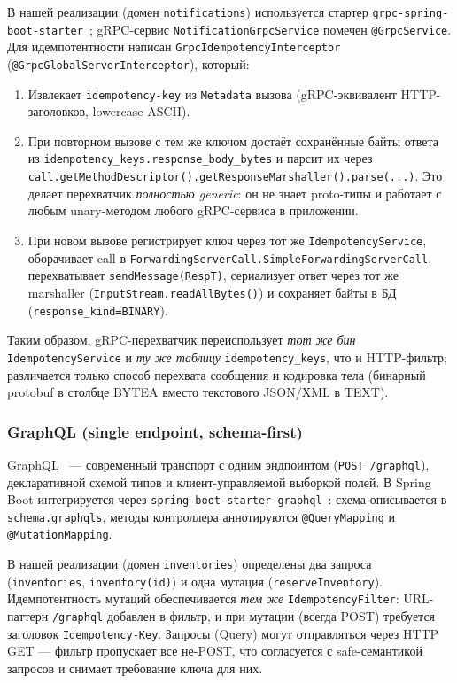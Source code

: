 В нашей реализации (домен \texttt{notifications}) используется стартер \texttt{grpc-spring-boot-starter}~\cite{grpc-spring-boot}; gRPC-сервис \texttt{NotificationGrpcService} помечен \texttt{@GrpcService}. Для идемпотентности написан \texttt{GrpcIdempotencyInterceptor} (\texttt{@GrpcGlobalServerInterceptor}), который:
\begin{enumerate}
    \item Извлекает \texttt{idempotency-key} из \texttt{Metadata} вызова (gRPC-эквивалент HTTP-заголовков, lowercase ASCII).
    \item При повторном вызове с тем же ключом достаёт сохранённые байты ответа из \texttt{idempotency\_keys.response\_body\_bytes} и парсит их через \texttt{call.getMethodDescriptor().getResponseMarshaller().parse(...)}. Это делает перехватчик \emph{полностью generic}: он не знает proto-типы и работает с любым unary-методом любого gRPC-сервиса в приложении.
    \item При новом вызове регистрирует ключ через тот же \texttt{IdempotencyService}, оборачивает call в \texttt{ForwardingServerCall.SimpleForwardingServerCall}, перехватывает \texttt{sendMessage(RespT)}, сериализует ответ через тот же marshaller (\texttt{InputStream.readAllBytes()}) и сохраняет байты в БД (\texttt{response\_kind=BINARY}).
\end{enumerate}

Таким образом, gRPC-перехватчик переиспользует \emph{тот же бин} \texttt{IdempotencyService} и \emph{ту же таблицу} \texttt{idempotency\_keys}, что и HTTP-фильтр; различается только способ перехвата сообщения и кодировка тела (бинарный protobuf в столбце BYTEA вместо текстового JSON/XML в TEXT).

\subsubsection{GraphQL (single endpoint, schema-first)}
\label{subsec:transport-graphql}

GraphQL~\cite{graphql-spec} --- современный транспорт с одним эндпоинтом (\texttt{POST /graphql}), декларативной схемой типов и клиент-управляемой выборкой полей. В Spring Boot интегрируется через \texttt{spring-boot-starter-graphql}~\cite{spring-graphql}: схема описывается в \texttt{schema.graphqls}, методы контроллера аннотируются \texttt{@QueryMapping} и \texttt{@MutationMapping}.

В нашей реализации (домен \texttt{inventories}) определены два запроса (\texttt{inventories}, \texttt{inventory(id)}) и одна мутация (\texttt{reserveInventory}). Идемпотентность мутаций обеспечивается \emph{тем же} \texttt{IdempotencyFilter}: URL-паттерн \texttt{/graphql} добавлен в фильтр, и при мутации (всегда POST) требуется заголовок \texttt{Idempotency-Key}. Запросы (Query) могут отправляться через HTTP GET --- фильтр пропускает все не-POST, что согласуется с safe-семантикой запросов и снимает требование ключа для них.

